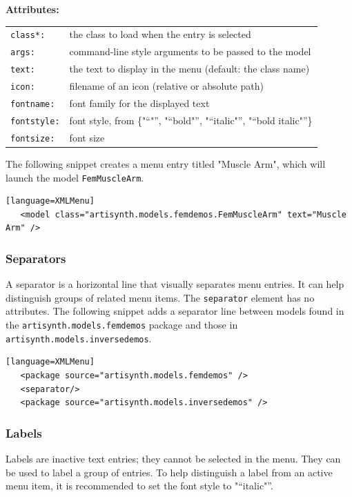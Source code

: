 \documentclass{article}
\newcommand{\openquot}{\iflatexml"\else``\fi}
\newcommand{\closequot}{\iflatexml"\else''\fi}
\newcommand{\quot}[1]{\openquot#1\closequot}
\begin{document}
\noindent \textbf{Attributes:}\\
\begin{tabular}{ll}
   {\tt class*:} & the class to load when the entry is selected\\
   {\tt args:} & command-line style arguments to be passed to the model\\
   {\tt text:} & the text to display in the menu (default: the class name)\\
   {\tt icon:} & filename of an icon (relative or absolute path)\\
   {\tt fontname:} & font family for the displayed text\\
   {\tt fontstyle:} & font style, from \{\quot{}, \quot{bold}, \quot{italic},
      \quot{bold italic}\}\\
   {\tt fontsize:} & font size
\end{tabular}

The following snippet creates a menu entry titled "Muscle Arm", which will
launch the model {\tt FemMuscleArm}.
\begin{lstlisting}[][language=XMLMenu]
   <model class="artisynth.models.femdemos.FemMuscleArm" text="Muscle Arm" />
\end{lstlisting}

\subsubsection{Separators}

A separator is a horizontal line that visually separates menu entries.  It 
can help distinguish groups of related menu items.  The {\tt separator} element
has no attributes.  The following snippet adds a separator line between models
found in the {\tt artisynth.models.femdemos} package and those in 
{\tt artisynth.models.inversedemos}.
\begin{lstlisting}[][language=XMLMenu]
   <package source="artisynth.models.femdemos" />
   <separator/>
   <package source="artisynth.models.inversedemos" />
\end{lstlisting}

\subsubsection{Labels}

Labels are inactive text entries; they cannot be selected in the menu.  They
can be used to label a group of entries.  To help distinguish a label from an
active menu item, it is recommended to set the font style to \quot{italic}.
\end{document}
